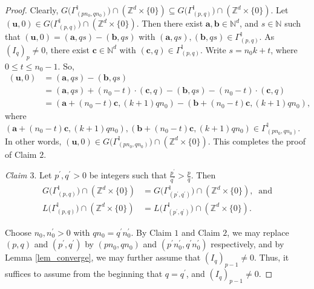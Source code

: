 \documentclass[10pt,a4paper]{amsart}
\begin{document}
\begin{proof}
Clearly, $G\big(\Gamma^{\mathbb{I}}_{(pn_0,qn_0)}\big) \cap \left(\mathbb{Z}^d\times \{0\}\right) \subseteq G\big(\Gamma^{\mathbb{I}}_{(p,q)}\big) \cap \left(\mathbb{Z}^d\times \{0\}\right)$.
Let $(\mathbf{u},0) \in G\big(\Gamma^{\mathbb{I}}_{(p,q)}\big) \cap \left(\mathbb{Z}^d\times \{0\}\right)$. Then there exist $\mathbf{a}, \mathbf{b}\in\mathbb{N}^d$, and $s\in\mathbb{N}$ such that $(\mathbf{u},0) = (\mathbf{a}, qs) - (\mathbf{b}, qs)$ with $(\mathbf{a}, qs), (\mathbf{b}, qs) \in \Gamma^{\mathbb{I}}_{(p,q)}$. As ${(I_q)}_p\neq 0$, there exist $\mathbf{c}\in\mathbb{N}^d$ with $(\mathbf{c},q)\in \Gamma^{\mathbb{I}}_{(p,q)}$. Write $s = n_0k + t$, where $0\leq t\leq n_0-1$. So,
\begin{align*}
 (\mathbf{u},0) &= (\mathbf{a}, qs) - (\mathbf{b}, qs)\\
 &= (\mathbf{a}, qs) + (n_0-t)\cdot (\mathbf{c},q) - (\mathbf{b}, qs) - (n_0-t)\cdot (\mathbf{c},q)\\
 &= (\mathbf{a} + (n_0-t)\mathbf{c}, (k+1)qn_0) - (\mathbf{b} + (n_0-t)\mathbf{c}, (k+1)qn_0),
\end{align*}
where $(\mathbf{a} + (n_0-t)\mathbf{c}, (k+1)qn_0), (\mathbf{b} + (n_0-t)\mathbf{c}, (k+1)qn_0) \in \Gamma^{\mathbb{I}}_{(pn_0,qn_0)}$. In other words, $(\mathbf{u},0) \in G\big(\Gamma^{\mathbb{I}}_{(pn_0,qn_0)}\big) \cap \left(\mathbb{Z}^d\times \{0\}\right)$. This completes the proof of Claim $2$.

\vspace{0.2cm}
\noindent
\emph{Claim $3$}. Let $p^{\prime},q^{\prime}>0$ be integers such that $\frac{p^{\prime}}{q^{\prime}}>\frac{p}{q}$. Then
\begin{align}
G\big(\Gamma^{\mathbb{I}}_{(p,q)}\big) \cap \left(\mathbb{Z}^d\times \{0\}\right) &= G\big(\Gamma^{\mathbb{I}}_{(p^{\prime},q^{\prime})}\big) \cap \left(\mathbb{Z}^d\times \{0\}\right),\;\;\text{and}\label{equal1}\\
L\big(\Gamma^{\mathbb{I}}_{(p,q)}\big) \cap \left(\mathbb{Z}^d\times \{0\}\right) &= L\big(\Gamma^{\mathbb{I}}_{(p^{\prime},q^{\prime})}\big) \cap \left(\mathbb{Z}^d\times \{0\}\right).\label{equal2}
\end{align}

Choose $n_0, n_0^{\prime}>0$ with $qn_0 = q^{\prime}n_0^{\prime}$. By Claim $1$ and Claim $2$, we may replace $(p,q)$ and $(p^{\prime},q^{\prime})$ by $(pn_0,qn_0)$ and $(p^{\prime}n^{\prime}_0,q^{\prime}n^{\prime}_0)$ respectively, and by Lemma \ref{lem_converge}, we may further assume that ${\left(I_{q}\right)}_{p-1} \neq 0$. Thus, it suffices to assume from the beginning that $q=q^{\prime}$, and ${\left(I_{q}\right)}_{p-1} \neq 0$.


\end{proof}
\end{document}
